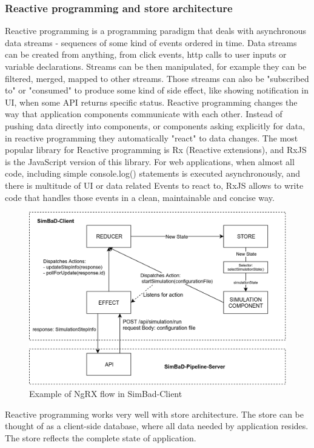 \subsubsection{Reactive programming and store architecture}
Reactive programming is a programming paradigm that deals with asynchronous data streams - sequences of some kind of events ordered in time. Data streams can be created from anything, from click events, http calls to user inputs or variable declarations. Streams can be then manipulated, for example they can be filtered, merged, mapped to other streams. Those streams can also be "subscribed to" or "consumed" to produce some kind of side effect, like showing notification in UI, when some API returns specific status. Reactive programming changes the way that application components communicate with each other. Instead of pushing data directly into components, or components asking explicitly for data, in reactive programming they automatically "react" to data changes. The most popular library for Reactive programming is Rx (Reactive extensions), and RxJS is the JavaScript version of this library. For web applications, when almost all code, including simple console.log() statements is executed asynchronously, and there is multitude of UI or data related Events to react to, RxJS allows to write code that handles those events in a clean, maintainable and concise way.
\begin{figure}[h!]
	\centering
		\includegraphics[width=0.9\linewidth]{diagrams/ngrx.png}
	\caption{Example of NgRX flow in SimBad-Client}
	\label{fig:ngrx}
\end{figure}
Reactive programming works very well with store architecture. The store can be thought of as a client-side database, where all data needed by application resides. The store reflects the complete state of application.
